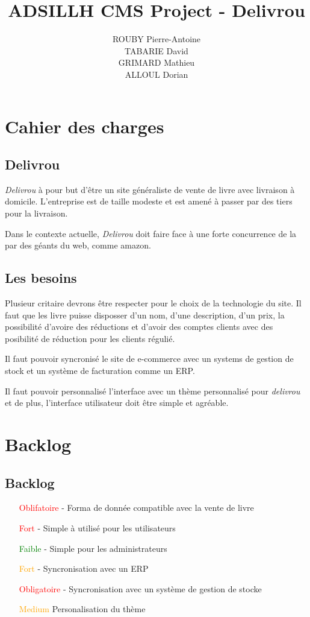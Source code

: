 \documentclass[a4paper,12pt]{report}
\title{ADSILLH CMS Project - Delivrou}
\author{ROUBY Pierre-Antoine \\ TABARIE David \\ GRIMARD Mathieu \\
  ALLOUL Dorian}
\begin{document}
\maketitle
\tableofcontents

\part{Cahier des charges}
\chapter{Delivrou}
\textit{Delivrou} à pour but d'être un site généraliste de vente de livre
avec livraison à domicile. L'entreprise est de taille modeste et est amené
à passer par des tiers pour la livraison.

Dans le contexte actuelle, \textit{Delivrou} doit faire face à une forte
concurrence de la par des géants du web, comme amazon.

\chapter{Les besoins}
Plusieur critaire devrons être respecter pour le choix de la technologie du
site.
Il faut que les livre puisse disposser d'un nom, d'une description, d'un prix,
la possibilité d'avoire des réductions et d'avoir des comptes clients avec des
posibilité de réduction pour les clients régulié.

Il faut pouvoir syncronisé le site de e-commerce avec un systems de gestion
de stock et un système de facturation comme un ERP.

Il faut pouvoir personnalisé l'interface avec un thème personnalisé pour
\textit{delivrou} et de plus, l'interface utilisateur doit être simple et
agréable.

\part{Backlog}
\chapter{Backlog}
\begin{itemize}
\item[\textcolor{red}{Oblifatoire} -] Forma de donnée compatible avec la vente
  de livre
\item[\textcolor{red}{Fort} -] Simple à utilisé pour les utilisateurs
\item[\textcolor{green}{Faible} -] Simple pour les administrateurs
\item[\textcolor{orange}{Fort} -] Syncronisation avec un ERP
\item[\textcolor{red}{Obligatoire} -] Syncronisation avec un système de
  gestion de stocke
\item[\textcolor{orange}{Medium}] Personalisation du thème
\end{itemize}
\end{document}
